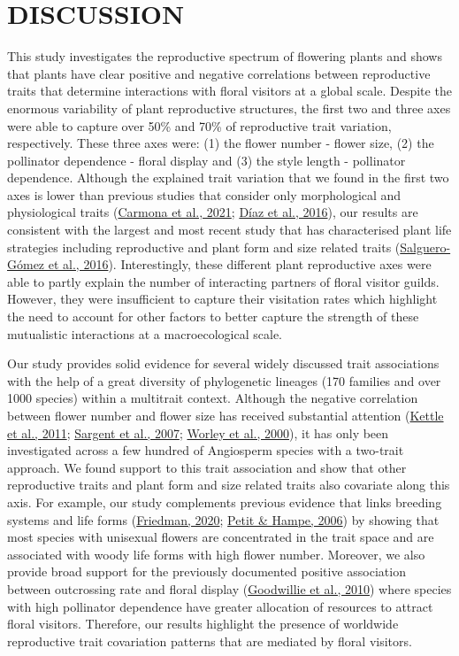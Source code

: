 \documentclass[
  12pt,
  a4paper,
]{article}
\begin{document}
\hypertarget{discussion}{%
\section{DISCUSSION}\label{discussion}}

This study investigates the reproductive spectrum of flowering plants and shows that plants have clear positive and negative correlations between reproductive traits that determine interactions with floral visitors at a global scale. Despite the enormous variability of plant reproductive structures, the first two and three axes were able to capture over 50\% and 70\% of reproductive trait variation, respectively. These three axes were: (1) the flower number - flower size, (2) the pollinator dependence - floral display and (3) the style length - pollinator dependence. Although the explained trait variation that we found in the first two axes is lower than previous studies that consider only morphological and physiological traits (\protect\hyperlink{ref-carmona2021}{Carmona et al., 2021}; \protect\hyperlink{ref-diaz2016}{Díaz et al., 2016}), our results are consistent with the largest and most recent study that has characterised plant life strategies including reproductive and plant form and size related traits (\protect\hyperlink{ref-salguero2016}{Salguero-Gómez et al., 2016}). Interestingly, these different plant reproductive axes were able to partly explain the number of interacting partners of floral visitor guilds. However, they were insufficient to capture their visitation rates which highlight the need to account for other factors to better capture the strength of these mutualistic interactions at a macroecological scale.

Our study provides solid evidence for several widely discussed trait associations with the help of a great diversity of phylogenetic lineages (170 families and over 1000 species) within a multitrait context. Although the negative correlation between flower number and flower size has received substantial attention (\protect\hyperlink{ref-kettle2011}{Kettle et al., 2011}; \protect\hyperlink{ref-sargent2007}{Sargent et al., 2007}; \protect\hyperlink{ref-worley2000}{Worley et al., 2000}), it has only been investigated across a few hundred of Angiosperm species with a two-trait approach. We found support to this trait association and show that other reproductive traits and plant form and size related traits also covariate along this axis. For example, our study complements previous evidence that links breeding systems and life forms (\protect\hyperlink{ref-friedman2020}{Friedman, 2020}; \protect\hyperlink{ref-petit2006}{Petit \& Hampe, 2006}) by showing that most species with unisexual flowers are concentrated in the trait space and are associated with woody life forms with high flower number. Moreover, we also provide broad support for the previously documented positive association between outcrossing rate and floral display (\protect\hyperlink{ref-goodwillie2010}{Goodwillie et al., 2010}) where species with high pollinator dependence have greater allocation of resources to attract floral visitors. Therefore, our results highlight the presence of worldwide reproductive trait covariation patterns that are mediated by floral visitors.
\end{document}
